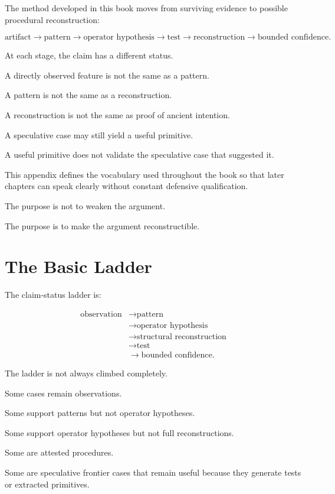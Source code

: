 \documentclass[11pt]{book}
\begin{document}
The method developed in this book moves from surviving evidence to possible procedural reconstruction:

\[
\text{artifact}
\rightarrow
\text{pattern}
\rightarrow
\text{operator hypothesis}
\rightarrow
\text{test}
\rightarrow
\text{reconstruction}
\rightarrow
\text{bounded confidence}.
\]

At each stage, the claim has a different status.

A directly observed feature is not the same as a pattern.

A pattern is not the same as a reconstruction.

A reconstruction is not the same as proof of ancient intention.

A speculative case may still yield a useful primitive.

A useful primitive does not validate the speculative case that suggested it.

This appendix defines the vocabulary used throughout the book so that later chapters can speak clearly without constant defensive qualification.

The purpose is not to weaken the argument.

The purpose is to make the argument reconstructible.

\section{The Basic Ladder}

The claim-status ladder is:

\[
\begin{aligned}
\text{observation}
&\rightarrow
\text{pattern} \\
&\rightarrow
\text{operator hypothesis} \\
&\rightarrow
\text{structural reconstruction} \\
&\rightarrow
\text{test} \\
&\rightarrow
\text{bounded confidence}.
\end{aligned}
\]

The ladder is not always climbed completely.

Some cases remain observations.

Some support patterns but not operator hypotheses.

Some support operator hypotheses but not full reconstructions.

Some are attested procedures.

Some are speculative frontier cases that remain useful because they generate tests or extracted primitives.
\end{document}
